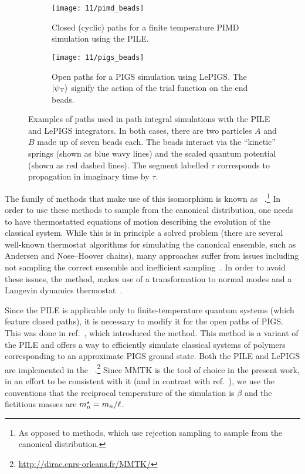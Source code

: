 \begin{figure}
	\begin{subfigure}[b]{\textwidth}
		\centering
		\texttt{[image: 11/pimd\_beads]}
		\caption{
			Closed (cyclic) paths for a finite temperature PIMD simulation using the PILE.
		}
		\vspace{4 mm}
	\end{subfigure}
	\begin{subfigure}[b]{\textwidth}
		\centering
		\texttt{[image: 11/pigs\_beads]}
		\caption{
			Open paths for a PIGS simulation using LePIGS.
			The $\ket{\psi_\mathrm{T}}$ signify the action of the trial function on the end beads.
		}
	\end{subfigure}
	\caption[
		Examples of paths used in path integral simulations
	]{
		Examples of paths used in path integral simulations with the PILE and LePIGS integrators.
		In both cases, there are two particles $A$ and $B$ made up of seven beads each.
		The beads interact via the ``kinetic'' springs (shown as blue wavy lines) and the scaled quantum potential (shown as red dashed lines).
		The segment labelled $\tau$ corresponds to propagation in imaginary time by $\tau$.
	}
	\label{fig:beads}
\end{figure}

The family of methods that make use of this isomorphism is known as ~\cite[471,479]{tuckerman2010statistical}.\footnote{
	As opposed to  methods, which use rejection sampling to sample from the canonical distribution.
}
In order to use these methods to sample from the canonical distribution, one needs to have thermostatted equations of motion describing the evolution of the classical system.
While this is in principle a solved problem (there are several well-known thermostat algorithms for simulating the canonical ensemble, such as Andersen and Nose--Hoover chains), many approaches suffer from issues including not sampling the correct ensemble and inefficient sampling~\cite{bussi2007accurate,ceriotti2010efficient}.
In order to avoid these issues, the  method, makes use of a transformation to normal modes and a Langevin dynamics thermostat~\cite{ceriotti2010efficient}.

Since the PILE is applicable only to finite-temperature quantum systems (which feature closed paths), it is necessary to modify it for the open paths of PIGS.
This was done in ref.~\cite{constable2013langevin}, which introduced the  method. 
This method is a variant of the PILE and offers a way to efficiently simulate classical systems of polymers corresponding to an approximate PIGS ground state.
Both the PILE and LePIGS are implemented in the ~\cite{hinsen2000molecular}.\footnote{
	\url{http://dirac.cnrs-orleans.fr/MMTK/}
}
Since MMTK is the tool of choice in the present work, in an effort to be consistent with it (and in contrast with ref.~\cite{ceriotti2010efficient}), we use the conventions that the reciprocal temperature of the simulation is $\beta$ and the fictitious masses are ${m}^\star_n = m_n / \ell$.

